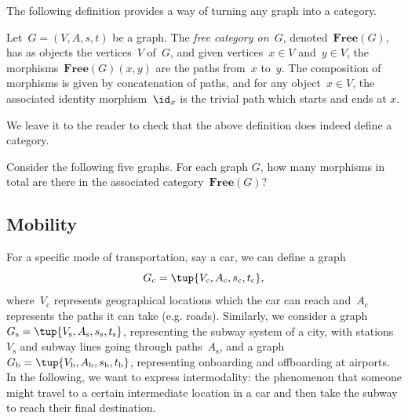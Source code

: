 The following definition provides a way of turning any graph into a category. 

\begin{ctdefinition}
Let~$G=(V,A,s,t)$ be a graph. The \emph{free category on~$G$}, denoted~$\mathbf{Free}(G)$, has as objects the vertices~$V$ of~$G$, and given vertices~$x\in V$ and~$y\in V$, the morphisms~$\mathbf{Free}(G)(x,y)$ are the paths from~$x$ to~$y$. 
The composition of morphisms is given by concatenation of paths, and for any object~$x \in V$, the associated identity morphism~$\id_x$ is the trivial path which starts and ends at $x$.
\end{ctdefinition}



We leave it to the reader to check that the above definition does indeed define a category. 




\begin{exercise}
Consider the following five graphs. For each graph $G$, how many morphisms in total are there in the associated category~$\mathbf{Free}(G)$?

    \begin{center}
    \end{center}
\end{exercise}

\subsection{Mobility}

For a specific mode of transportation, say a car, we can define a graph
\begin{equation*}
    G_\mathrm{c}=\tup{V_\mathrm{c},A_\mathrm{c},s_\mathrm{c},t_\mathrm{c}},
\end{equation*}
where~$V_\mathrm{c}$ represents geographical locations which the car can reach and~$A_\mathrm{c}$ represents the paths it can take (e.g. roads). Similarly, we consider a graph~$G_\mathrm{s}=\tup{V_\mathrm{s},A_\mathrm{s},s_\mathrm{s},t_\mathrm{s}}$, representing the subway system of a city, with stations~$V_\mathrm{s}$ and subway lines going through paths~$A_\mathrm{s}$, and a graph $G_\mathrm{b}=\tup{V_\mathrm{b},A_\mathrm{b},s_\mathrm{b},t_\mathrm{b}}$, representing onboarding and offboarding at airports. In the following, we want to express intermodality: the phenomenon that someone might travel to a certain intermediate location in a car and then take the subway to reach their final destination.

